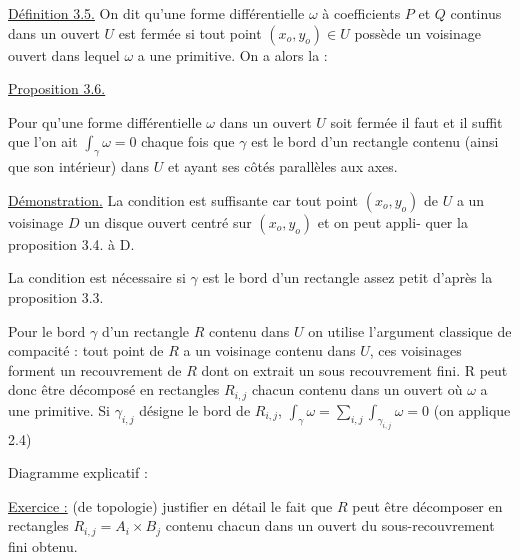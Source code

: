 
\uline{Définition 3.5.}
On dit qu'une forme différentielle $\omega$ à coefficients $P$ et $Q$
continus dans un ouvert $U$ est fermée si tout point $(x_o,y_o) \in U$ possède
un voisinage ouvert dans lequel $\omega$ a une primitive. On a alors la :

\uline{Proposition 3.6.}

Pour qu'une forme différentielle $\omega$ dans un ouvert $U$ soit fermée
il faut et il suffit que l'on ait $\int_\gamma \omega = 0$ chaque fois que $\gamma$ est le bord
d'un rectangle contenu (ainsi que son intérieur) dans $U$ et ayant ses côtés
parallèles aux axes.

\uline{Démonstration.} La condition est suffisante car tout point $(x_o,y_o)$ de $U$ a
un voisinage $D$  un disque ouvert centré sur $(x_o,y_o)$ et on peut appli-%
quer la proposition 3.4. à D.

La condition est nécessaire si $\gamma$ est le bord d'un rectangle assez petit
d'après la proposition 3.3.

Pour le bord $\gamma$ d'un rectangle $R$ contenu dans $U$ on utilise
l'argument classique de compacité : tout point de $R$ a un voisinage contenu
dans $U$, ces voisinages forment un recouvrement de $R$ dont on extrait un
sous recouvrement fini. R peut donc être décomposé en rectangles $R_{i,j}$ chacun
contenu dans un ouvert où $\omega$ a une primitive. Si $\gamma_{i,j}$ désigne le bord de
$R_{i,j}$, $\int_\gamma \omega = \sum_{i,j} \int_{\gamma_{i,j}} \omega = 0$
(on applique 2.4)

Diagramme explicatif :

\uline{Exercice :} (de topologie)
justifier en détail le fait que $R$ peut être décomposer en rectangles
$R_{i,j} = A_i \times B_j$ contenu chacun dans un ouvert du sous-recouvrement fini obtenu.

